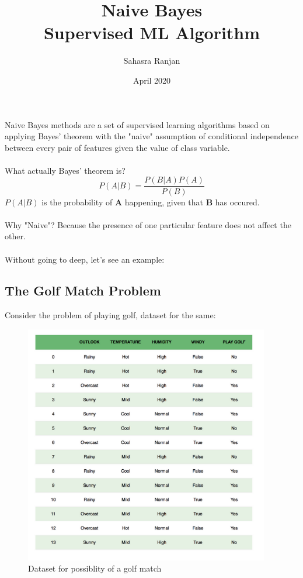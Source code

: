 \documentclass[12pt, A4]{report}
\title{\textbf{Naive Bayes}\\ \large{Supervised ML Algorithm}}
\author{Sahasra Ranjan}
\date{April 2020}
\begin{document}
\begin{titlepage}
\maketitle
\end{titlepage}

Naive Bayes methods are a set of supervised learning algorithms based on applying Bayes' theorem with the "naive" assumption of conditional independence between every pair of features given the value of class variable.\\ \\
What actually Bayes' theorem is?
\begin{equation}\label {eq:bayes}
	P(A|B) = \frac{P(B|A)P(A)}{P(B)}
\end{equation}
$P(A|B)$ is the probability of \textbf{A} happening, given that \textbf{B} has occured.\\ \\ Why "Naive"? Because the presence of one particular feature does not affect the other.
\\ \\ 
Without going to deep, let's see an example:

\subsection*{The Golf Match Problem}
	Consider the problem of playing golf, dataset for the same:
	\begin{figure}[h]
		\centering
		\includegraphics[scale=0.4]{golf.png}
		\caption{Dataset for possiblity of a golf match}
	\end{figure}
\end{document}
